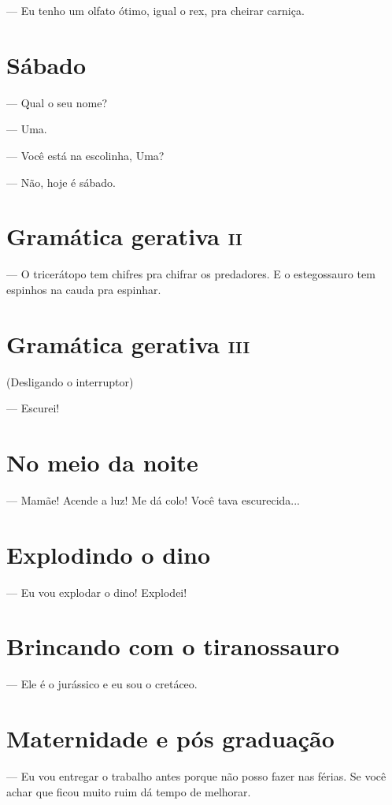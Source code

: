 {— Eu tenho um olfato ótimo, igual o rex, pra cheirar carniça.

\chapter{Sábado}

— Qual o seu nome?

— Uma.

— Você está na escolinha, Uma?

— Não, hoje é sábado.

\chapter{Gramática gerativa \textsc{ii}}

— O tricerátopo tem chifres pra chifrar os predadores. E o estegossauro
tem espinhos na cauda pra espinhar.

\chapter{Gramática gerativa \textsc{iii}}

(Desligando o interruptor)

— Escurei!

\chapter{No meio da noite}

— Mamãe! Acende a luz! Me dá colo! Você tava escurecida...

\chapter{Explodindo o dino}

— Eu vou explodar o dino! Explodei!

\chapter{Brincando com o tiranossauro}

— Ele é o jurássico e eu sou o cretáceo.

\chapter{Maternidade e pós graduação}

— Eu vou entregar o trabalho antes porque não posso fazer nas férias. Se
você achar que ficou muito ruim dá tempo de melhorar.

}
